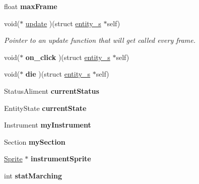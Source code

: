 \begin{DoxyCompactItemize}
float {\bfseries max\+Frame}
\item 
\mbox{\label{structentity__s_a776a062f6989cc2e1a2ad5bea9a4f8f7}} 
void($\ast$ \hyperlink{structentity__s_a776a062f6989cc2e1a2ad5bea9a4f8f7}{update} )(struct \hyperlink{structentity__s}{entity\+\_\+s} $\ast$self)
\begin{DoxyCompactList}\small\item\em Pointer to an update function that will get called every frame. \end{DoxyCompactList}\item 
\mbox{\label{structentity__s_ac257dd14ac652b641c45bc547e44cfe0}} 
void($\ast$ {\bfseries on\+\_\+click} )(struct \hyperlink{structentity__s}{entity\+\_\+s} $\ast$self)
\item 
\mbox{\label{structentity__s_a5909c0b97159616bea302921432f592f}} 
void($\ast$ {\bfseries die} )(struct \hyperlink{structentity__s}{entity\+\_\+s} $\ast$self)
\item 
\mbox{\label{structentity__s_a57aac704311673d70a30a8908f6efe07}} 
Status\+Aliment {\bfseries current\+Status}
\item 
\mbox{\label{structentity__s_ae0c2db5760d2d410ab1a04414ef9b723}} 
Entity\+State {\bfseries current\+State}
\item 
\mbox{\label{structentity__s_a9746405130f2a414757b284c944ca984}} 
Instrument {\bfseries my\+Instrument}
\item 
\mbox{\label{structentity__s_a448c3bebd13b4ba3a6a2d0b3193b763b}} 
Section {\bfseries my\+Section}
\item 
\mbox{\label{structentity__s_a749e75a09335776cf930f98a44e4d951}} 
\hyperlink{struct_sprite___s}{Sprite} $\ast$ {\bfseries instrument\+Sprite}
\item 
\mbox{\label{structentity__s_a4f7286ca0bafc729006f4685ca37ec97}} 
int {\bfseries stat\+Marching}
\item 
\mbox{\label{structentity__s_ac52bb6717b6ce50342c60bf045f4b14c}} 

\end{DoxyCompactItemize}

